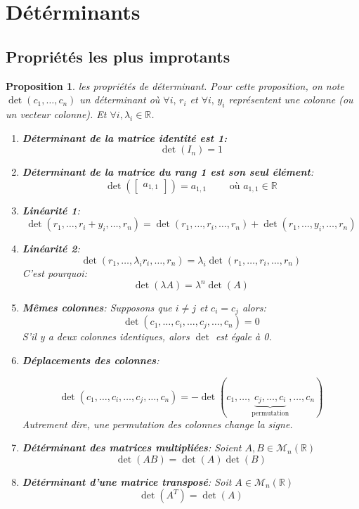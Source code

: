 \documentclass[a4paper]{article}
\newcommand{\R}{\mathbb{R}}
\newtheorem{prop}{Proposition}[section]
\begin{document}
\section{Détérminants}
\subsection{Propriétés les plus improtants}
\begin{prop} les propriétés de déterminant.
    Pour cette proposition, on note $\det(c_1, \ldots, c_n)$ un déterminant où $\forall i, \, r_i$ et $\forall i, \, y_i$ représentent une colonne (ou un vecteur colonne). Et $\forall i, \lambda_i \in \R$.
    \begin{enumerate}
        \item \textbf{Déterminant de la matrice identité est 1:}
            \[
            \det(I_n) = 1
            \] 
        \item \textbf{Déterminant de la matrice du rang 1 est son seul élément}:
            \[
                \det(\begin{bmatrix} a_{1,1} \end{bmatrix} ) = a_{1,1} \qquad \text{ où } a_{1,1} \in \R
            \] 
        \item \textbf{Linéarité 1}:
            \[
            \det(r_1, \ldots, r_i + y_i, \ldots, r_n) = \det(r_1, \ldots, r_i, \ldots, r_n) + \det(r_1, \ldots, y_i, \ldots, r_n)
            \] 
        \item \textbf{Linéarité 2}:
            \[
            \det(r_1, \ldots, \lambda_ir_i, \ldots, r_n) = \lambda_i\det(r_1, \ldots, r_i, \ldots, r_n) 
            \] 
               C'est pourquoi:
               \[
               \det(\lambda A) = \lambda^n\det(A)
               \] 
        \item \textbf{Mêmes colonnes}: Supposons que $i \neq j$ et $c_i = c_j$ alors:
             \[
            \det(c_1, \ldots, c_i, \ldots, c_j, \ldots, c_n) = 0
            \] 
            S'il y a deux colonnes identiques, alors $\det$ est égale à 0.
        \item \textbf{Déplacements des colonnes}:
            
\[
    \det(c_1, \ldots, c_i, \ldots, c_j, \ldots, c_n) 
    = -\det(c_1, \ldots, 
    \underbrace{c_j , \ldots, 
    c_i}_{\text{permutation}}, \ldots, c_n)
\]
Autrement dire, une permutation des colonnes change la signe.

\item \textbf{Détérminant des matrices multipliées}: Soient $A, B \in \mathcal{M}_n(\R)$
    \[
        \det(AB) = \det(A)\det(B) 
    \] 

\item \textbf{Détérminant d'une matrice transposé}: Soit $A \in \mathcal{M}_n(\R)$
    \[
        \det(A^{T}) = \det(A)
    \] 


\end{enumerate}
\end{prop}
\end{document}
